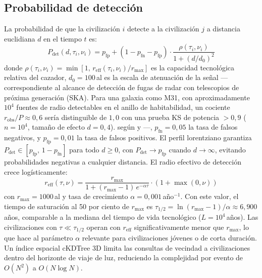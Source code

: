 \documentclass[11pt,a4paper,onecolumn]{article}
\begin{document}
\subsection{Probabilidad de detección}
\label{sec:detection}

La probabilidad de que la civilización $i$ detecte a la civilización
$j$ a distancia euclidiana $d$ en el tiempo $t$ es:
\begin{equation}
  P_\text{det}(d, \tau_i, \nu_i) =
    p_\text{fp} + (1 - p_\text{fn} - p_\text{fp})
    \cdot \frac{\rho(\tau_i,\nu_i)}{1 + (d/d_0)^2}
  \label{eq:pdet}
\end{equation}
donde $\rho(\tau_i,\nu_i) = \min[1,\, r_\text{eff}(\tau_i,\nu_i)/r_\text{max}]$
es la capacidad tecnológica relativa del cazador, $d_0 = 100$\,al es
la escala de atenuación de la señal —correspondiente al alcance de
detección de fugas de radar con telescopios de próxima generación (SKA).
Para una galaxia como M31, con aproximadamente $10^4$ fuentes de radio
detectables en el anillo de habitabilidad, un cociente $r_\text{obs}/P
\approx 0{,}6$ sería distinguible de $1{,}0$ con una prueba KS de
potencia $> 0{,}9$ ($n = 10^4$, tamaño de efecto $d = 0{,}4$).
según \citet{loeb2007} y \citet{forgannichol2011}—, $p_\text{fn} = 0{,}05$ la
tasa de falsos negativos, y $p_\text{fp} = 0{,}01$ la tasa de falsos
positivos.
El perfil lorentziano garantiza $P_\text{det} \in [p_\text{fp},\, 1-p_\text{fn}]$
para todo $d \geq 0$, con $P_\text{det} \to p_\text{fp}$ cuando
$d \to \infty$, evitando probabilidades negativas a cualquier distancia.
El radio efectivo de detección crece logísticamente:
\begin{equation}
  r_\text{eff}(\tau, \nu) =
    \frac{r_\text{max}}{1 + (r_\text{max}-1)\,e^{-\alpha\tau}}
    \cdot (1 + \max(0,\nu))
  \label{eq:reff}
\end{equation}
con $r_\text{max} = 1000$\,al \citep{troitskij1989,loeb2007} y tasa
de crecimiento $\alpha = 0{,}001$\,año$^{-1}$.
Con este valor, el tiempo de saturación al 50 por ciento de
$r_\text{max}$ es
$\tau_{1/2} = \ln(r_\text{max}-1)/\alpha \approx 6{,}900$\,años,
comparable a la mediana del tiempo de vida tecnológico ($L = 10^4$\,años).
Las civilizaciones con $\tau \ll \tau_{1/2}$ operan con $r_\text{eff}$
significativamente menor que $r_\text{max}$, lo que hace al parámetro
$\alpha$ relevante para civilizaciones jóvenes o de corta duración.
Un índice espacial cKDTree 3D \citep{maneewongvatana1999} limita las
consultas de vecindad a civilizaciones dentro del horizonte de viaje
de luz, reduciendo la complejidad por evento de $O(N^2)$ a
$O(N \log N)$.
\end{document}
